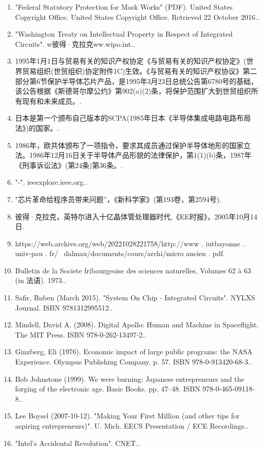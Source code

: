 \begin{enumerate}
\item "Federal Statutory Protection for Mask Works" (PDF). United States Copyright Office. United States Copyright Office. Retrieved 22 October 2016..
\item "Washington Treaty on Intellectual Property in Respect of Integrated Circuits". w彼得·克拉克ww.wipo.int..
\item 1995年1月1日与贸易有关的知识产权协定《与贸易有关的知识产权协定》(世界贸易组织(世贸组织)协定附件1C)生效。《与贸易有关的知识产权协议》第二部分第6节保护半导体芯片产品，是1995年3月23日总统公告第6780号的基础，该公告根据《斯德哥尔摩公约》第902(a)(2)条，将保护范围扩大到世贸组织所有现有和未来成员。.
\item 日本是第一个颁布自己版本的SCPA(1985年日本《半导体集成电路电路布局法》)的国家。.
\item 1986年，欧共体颁布了一项指令，要求其成员通过保护半导体地形的国家立法。1986年12月16日关于半导体产品形貌的法律保护，第1(1)(b)条，1987年《刑事诉讼法》(第24条)第36条。.
\item "-". ieeexplore.ieee.org..
\item "芯片革命给程序员带来问题”，《新科学家》(第193卷，第2594号).
\item 彼得·克拉克，英特尔进入十亿晶体管处理器时代,《EE时报》，2005年10月14日.
\item https://web.archive.org/web/20221028221758/http://www . iutbayonne . univ-pau . fr/~ dalmau/documents/cours/archi/micro ancien . pdf.
\item Bulletin de la Societe fribourgeoise des sciences naturelles, Volumes 62 à 63 (in 法语). 1973..
\item Safir, Ruben (March 2015). "System On Chip - Integrated Circuits". NYLXS Journal. ISBN 9781312995512..
\item Mindell, David A. (2008). Digital Apollo: Human and Machine in Spaceflight. The MIT Press. ISBN 978-0-262-13497-2..
\item Ginzberg, Eli (1976). Economic impact of large public programs: the NASA Experience. Olympus Publishing Company. p. 57. ISBN 978-0-913420-68-3..
\item Bob Johnstone (1999). We were burning: Japanese entrepreneurs and the forging of the electronic age. Basic Books. pp. 47–48. ISBN 978-0-465-09118-8..
\item Lee Boysel (2007-10-12). "Making Your First Million (and other tips for aspiring entrepreneurs)". U. Mich. EECS Presentation / ECE Recordings..
\item "Intel's Accidental Revolution". CNET..

\end{enumerate}
